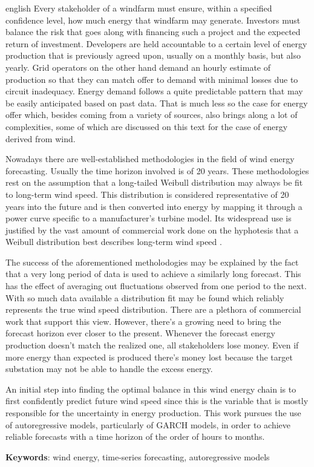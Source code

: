 \documentclass[
	12pt,				%
	openright,			%
	oneside,			%
	a4paper,			%
	english,			%
	french,				%
	spanish,			%
	brazil				%
	]{abntex2}
\begin{document}
\begin{resumo}[Abstract]
 \begin{otherlanguage*}{english}
	Every stakeholder of a windfarm must ensure, within a specified confidence level, how much energy that windfarm may generate. Investors must balance the risk that goes along with financing such a project and the expected return of investment. Developers are held accountable to a certain level of energy production that is previously agreed upon, usually on a monthly basis, but also yearly. Grid operators on the other hand demand an hourly estimate of production so that they can match offer to demand with minimal losses due to circuit inadequacy. Energy demand follows a quite predictable pattern that may be easily anticipated based on past data. That is much less so the case for energy offer which, besides coming from a variety of sources, also brings along a lot of complexities, some of which are discussed on this text for the case of energy derived from wind.
	
	Nowadays there are well-established methodologies in the field of wind energy forecasting. Usually the time horizon involved is of 20 years. These methodologies rest on the assumption that a long-tailed Weibull distribution \cite{weibull} may always be fit to long-term wind speed. This distribution is considered representative of 20 years into the future and is then converted into energy \cite{art15} by mapping it through a power curve specific to a manufacturer's turbine model. 
Its widespread use is justified by the vast amount of commercial work done on the hyphotesis that a Weibull distribution best describes long-term wind speed \cite{art14}.

	The success of the aforementioned metholodogies may be explained by the fact that a very long period of data is used to achieve a similarly long forecast. This has the effect of averaging out fluctuations observed from one period to the next. With so much data available a distribution fit may be found which reliably represents the true wind speed distribution. There are a plethora of commercial work that support this view. However, there's a growing need to bring the forecast horizon ever closer to the present. Whenever the forecast energy production doesn't match the realized one, all stakeholders lose money. Even if more energy than expected is produced there's money lost because the target substation may not be able to handle the excess energy. 
	
	An initial step into finding the optimal balance in this wind energy chain is to first confidently predict future wind speed since this is the variable that is mostly responsible for the uncertainty in energy production. This work pursues the use of autoregressive models, particularly of GARCH models, in order to achieve reliable forecasts with a time horizon of the order of hours to months.

 
   \textbf{Keywords}: wind energy, time-series forecasting, autoregressive models
 \end{otherlanguage*}
\end{resumo}
\end{document}
